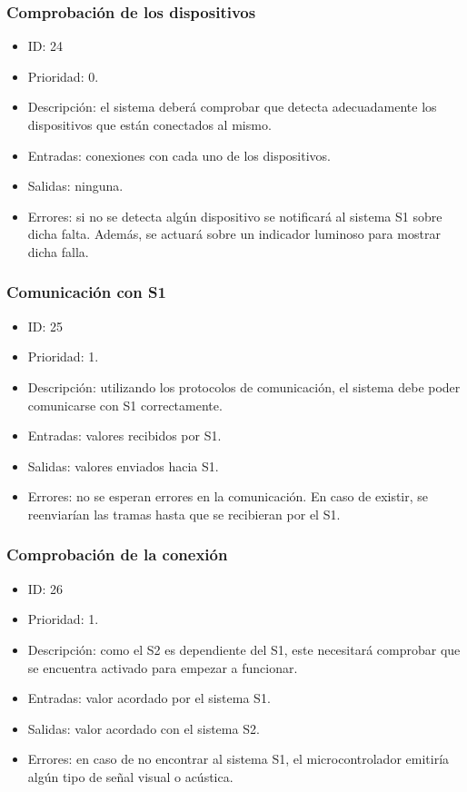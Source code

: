\subsubsection{Comprobación de los dispositivos}
\begin{itemize}
    \item ID: 24
    \item Prioridad: 0.
    \item Descripción: el sistema deberá comprobar que detecta adecuadamente los dispositivos que están conectados al mismo.
    \item Entradas: conexiones con cada uno de los dispositivos.
    \item Salidas: ninguna.
    \item Errores: si no se detecta algún dispositivo se notificará al sistema \ac{S1} sobre dicha falta. Además, se actuará sobre un indicador luminoso para mostrar dicha falla.
\end{itemize}

\subsubsection{Comunicación con \ac{S1}}
\begin{itemize}
    \item ID: 25
    \item Prioridad: 1.
    \item Descripción: utilizando los protocolos de comunicación, el sistema debe poder comunicarse con \ac{S1} correctamente.
    \item Entradas: valores recibidos por \ac{S1}.
    \item Salidas: valores enviados hacia \ac{S1}.
    \item Errores: no se esperan errores en la comunicación. En caso de existir, se reenviarían las tramas hasta que se recibieran por el \ac{S1}.
\end{itemize}

\subsubsection{Comprobación de la conexión}
\begin{itemize}
    \item ID: 26
    \item Prioridad: 1.
    \item Descripción: como el \ac{S2} es dependiente del \ac{S1}, este necesitará comprobar que se encuentra activado para empezar a funcionar.
    \item Entradas: valor acordado por el sistema \ac{S1}.
    \item Salidas: valor acordado con el sistema \ac{S2}.
    \item Errores: en caso de no encontrar al sistema \ac{S1}, el microcontrolador emitiría algún tipo de señal visual o acústica.
\end{itemize}